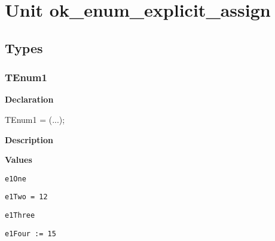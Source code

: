 \documentclass{report}
\newif\ifpdf
\begin{document}
\label{toc}\tableofcontents
\newpage
\newlength{\tmplength}
\chapter{Unit ok{\_}enum{\_}explicit{\_}assign}
\label{ok_enum_explicit_assign}
\section{Types}
\ifpdf
\subsection*{\large{\textbf{TEnum1}}\normalsize\hspace{1ex}\hrulefill}
\else
\subsection*{TEnum1}
\fi
\label{ok_enum_explicit_assign-TEnum1}
\begin{list}{}{
\setlength{\itemindent}{0cm}
\setlength{\listparindent}{0cm}
\setlength{\leftmargin}{\evensidemargin}
\addtolength{\leftmargin}{\tmplength}
\settowidth{\labelsep}{X}
\addtolength{\leftmargin}{\labelsep}
\setlength{\labelwidth}{\tmplength}
}
\item[\textbf{Declaration}\hfill]
\ifpdf
\begin{flushleft}
\fi
\begin{ttfamily}
TEnum1 = (...);\end{ttfamily}

\ifpdf
\end{flushleft}
\fi

\par
\item[\textbf{Description}]
 \item[\textbf{Values}]
\begin{description}
\item[\texttt{e1One}] \label{ok_enum_explicit_assign-e1One}
\index{}
 
\item[\texttt{e1Two = 12}] \label{ok_enum_explicit_assign-e1Two}
\index{}
 
\item[\texttt{e1Three}] \label{ok_enum_explicit_assign-e1Three}
\index{}
 
\item[\texttt{e1Four := 15}] \label{ok_enum_explicit_assign-e1Four}
\index{}
 
\end{description}


\end{list}
\ifpdf
\end{document}
